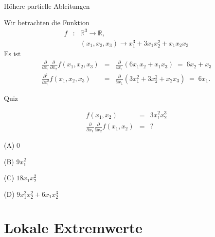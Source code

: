 \documentclass[german]{beamer}
\newcommand{\bq}{\begin{eqnarray*}}
\newcommand{\eq}{\end{eqnarray*}}
\begin{document}
\begin{frame}{H\"ohere partielle Ableitungen}

\begin{example}
Wir betrachten die Funktion
\bq
 f & : & {\mathbb R}^3 \rightarrow {\mathbb R},
 \nonumber \\
 & & (x_1,x_2,x_3) \rightarrow x_1^3 + 3 x_1 x_2^2 + x_1 x_2 x_3
\eq
Es ist
\bq
 \frac{\partial}{\partial x_1} \frac{\partial}{\partial x_2} f(x_1,x_2,x_3) 
 & = & 
 \frac{\partial}{\partial x_1} \left( 6 x_1 x_2 + x_1 x_3 \right)
 \; = \; 6 x_2 + x_3
 \nonumber \\
 \frac{\partial^2}{\partial x_1^2} f(x_1,x_2,x_3) 
 & = & 
 \frac{\partial}{\partial x_1} \left( 3 x_1^2 + 3 x_2^2 + x_2 x_3 \right)
 \; = \; 6 x_1.
\eq
\end{example}

\end{frame}

\begin{frame}{Quiz}

\bq
 f\left(x_1,x_2\right) & = & 3 x_1^2 x_2^3
 \nonumber \\
 \frac{\partial}{\partial x_1} \frac{\partial}{\partial x_2} f\left(x_1,x_2\right)
 & = & ?
\eq
\begin{description}
\item{(A)} $0$
\item{(B)} $9 x_1^2$
\item{(C)} $18 x_1 x_2^2$
\item{(D)} $9 x_1^2 x_2^2 + 6 x_1 x_2^3$
\end{description}

\end{frame}


\section{Lokale Extremwerte}

\frame{\sectionpage}
\end{document}
